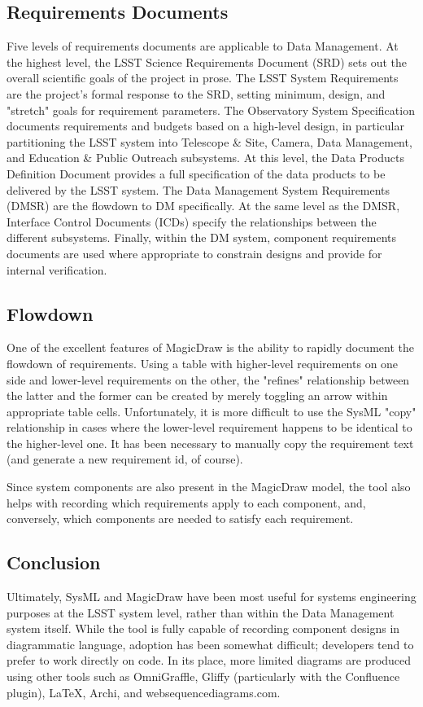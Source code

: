 \subsection{Requirements Documents}

Five levels of requirements documents are applicable to Data Management.
At the highest level, the LSST Science Requirements Document (SRD) sets out the overall scientific goals of the project in prose.
The LSST System Requirements are the project's formal response to the SRD, setting minimum, design, and "stretch" goals for requirement parameters.
The Observatory System Specification documents requirements and budgets based on a high-level design, in particular partitioning the LSST system into Telescope & Site, Camera, Data Management, and Education & Public Outreach subsystems.
At this level, the Data Products Definition Document provides a full specification of the data products to be delivered by the LSST system.
The Data Management System Requirements (DMSR) are the flowdown to DM specifically.
At the same level as the DMSR, Interface Control Documents (ICDs) specify the relationships between the different subsystems.
Finally, within the DM system, component requirements documents are used where appropriate to constrain designs and provide for internal verification.

\subsection{Flowdown}

One of the excellent features of MagicDraw is the ability to rapidly document the flowdown of requirements.
Using a table with higher-level requirements on one side and lower-level requirements on the other, the "refines" relationship between the latter and the former can be created by merely toggling an arrow within appropriate table cells.
Unfortunately, it is more difficult to use the SysML "copy" relationship in cases where the lower-level requirement happens to be identical to the higher-level one.
It has been necessary to manually copy the requirement text (and generate a new requirement id, of course).

Since system components are also present in the MagicDraw model, the tool also helps with recording which requirements apply to each component, and, conversely, which components are needed to satisfy each requirement.

\subsection{Conclusion}

Ultimately, SysML and MagicDraw have been most useful for systems engineering purposes at the LSST system level, rather than within the Data Management system itself.
While the tool is fully capable of recording component designs in diagrammatic language, adoption has been somewhat difficult; developers tend to prefer to work directly on code.
In its place, more limited diagrams are produced using other tools such as OmniGraffle, Gliffy (particularly with the Confluence plugin), LaTeX, Archi, and websequencediagrams.com.

